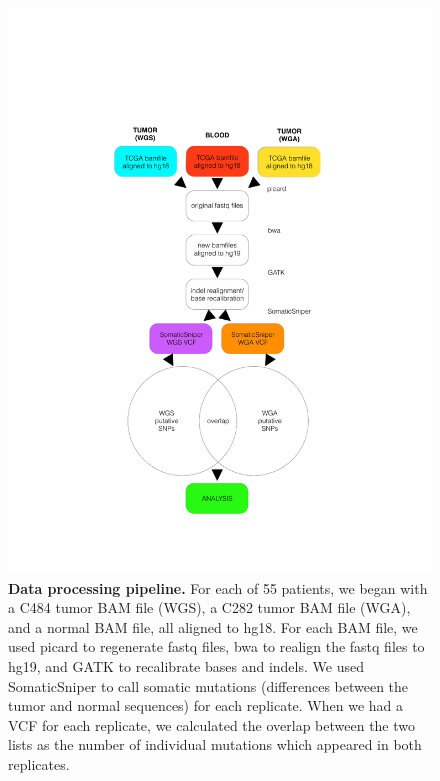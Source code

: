 \documentclass[11pt]{article} %
\begin{document}
\begin{figure}
\centerline{
\includegraphics[width=5in]{pipeline.pdf} }
\caption{\textbf{Data processing pipeline.} For each of 55 patients, we began with a C484 tumor BAM file (WGS), a C282 tumor BAM file (WGA), and a normal BAM file, all aligned to hg18. For each BAM file, we used picard to regenerate fastq files, bwa to realign the fastq files to hg19, and GATK to recalibrate bases and indels. We used SomaticSniper to call somatic mutations (differences between the tumor and normal sequences) for each replicate. When we had a VCF for each replicate, we calculated the overlap between the two lists as the number of individual mutations which appeared in both replicates.}
\label{fig:pipeline}
\end{figure}
\end{document}
